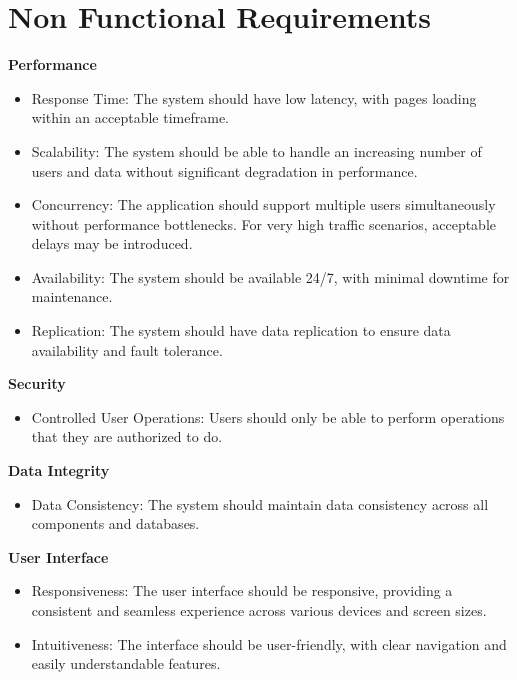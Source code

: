\section{Non Functional Requirements}

\textbf{Performance}

\begin{itemize}
    \item Response Time: The system should have low latency, with pages loading within an acceptable timeframe.
    \item Scalability: The system should be able to handle an increasing number of users and data without significant degradation in performance.
    \item Concurrency: The application should support multiple users simultaneously without performance bottlenecks. For very high traffic scenarios, acceptable delays may be introduced.
    \item Availability: The system should be available 24/7, with minimal downtime for maintenance.
    \item Replication: The system should have data replication to ensure data availability and fault tolerance.
\end{itemize}

\textbf{Security}
\begin{itemize}
    \item Controlled User Operations: Users should only be able to perform operations that they are authorized to do.
\end{itemize}

\textbf{Data Integrity}

\begin{itemize}
    \item Data Consistency: The system should maintain data consistency across all components and databases.
\end{itemize}

\textbf{User Interface}
\begin{itemize}
    \item Responsiveness: The user interface should be responsive, providing a consistent and seamless experience across various devices and screen sizes.
    \item Intuitiveness: The interface should be user-friendly, with clear navigation and easily understandable features.
\end{itemize}

\newpage


